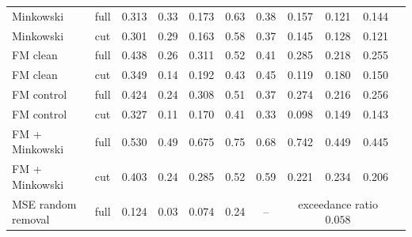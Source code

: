 \documentclass{article}
\begin{document}
\begin{table}[t]
{\begin{tabular}{llccccccccc}
    Minkowski & full & 0.313 & 0.33 & 0.173 & 0.63 & 0.38 & 0.157 & 0.121 & 0.144 \\
    Minkowski & cut & 0.301 & 0.29 & 0.163 & 0.58 & 0.37 & 0.145 & 0.128 & 0.121 \\
    FM clean & full & 0.438 & 0.26 & 0.311 & 0.52 & 0.41 & 0.285 & 0.218 & 0.255 \\
    FM clean & cut & 0.349 & 0.14 & 0.192 & 0.43 & 0.45 & 0.119 & 0.180 & 0.150 \\
    FM control & full & 0.424 & 0.24 & 0.308 & 0.51 & 0.37 & 0.274 & 0.216 & 0.256 \\
    FM control & cut & 0.327 & 0.11 & 0.170 & 0.41 & 0.33 & 0.098 & 0.149 & 0.143 \\
    FM + Minkowski & full & 0.530 & 0.49 & 0.675 & 0.75 & 0.68 & 0.742 & 0.449 & 0.445 \\
    FM + Minkowski & cut & 0.403 & 0.24 & 0.285 & 0.52 & 0.59 & 0.221 & 0.234 & 0.206 \\
    MSE random removal & full & 0.124 & 0.03 & 0.074 & 0.24 & -- & \multicolumn{3}{c}{exceedance ratio $0.058$} \\
    \bottomrule
  \end{tabular}}
\end{table}
\end{document}
